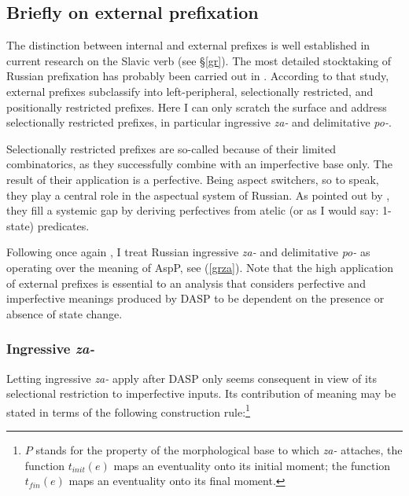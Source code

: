 \documentclass[output=paper,colorlinks,citecolor=brown]{langscibook}
\begin{document}


\subsection{Briefly on external prefixation}\label{zapo}
The distinction between internal and external prefixes is well established in current research on the Slavic verb (see \S \ref{gr}). The most detailed stocktaking of Russian prefixation has probably been carried out in \citet{Tatevo13}. According to that study, external prefixes subclassify into left-peripheral, selectionally restricted, and positionally restricted prefixes. Here I can only scratch the surface and address selectionally restricted prefixes, in particular ingressive \textit{za-} and delimitative \textit{po-}. 

Selectionally restricted prefixes are so-called because of their limited combinatorics, as they successfully combine with an imperfective base only. The result of their application is a perfective.
Being aspect switchers, so to speak, they play a central role in the aspectual system of Russian. As pointed out by \citet{Dickey06}, they fill a systemic gap by deriving perfectives from atelic (or as I would say: 1-state) predicates.     

Following once again \citet{Ramchand08}, I treat Russian ingressive \textit{za-} and delimitative \textit{po-} as operating over the meaning of AspP, see (\ref{grza}). Note that the high application of external prefixes is essential to an analysis that considers perfective and imperfective meanings produced by DASP to be dependent on the presence or absence of state change.  

\subsubsection{Ingressive \textit{za-}}\label{zapoza}
Letting ingressive \textit{za-} apply after DASP only seems consequent in view of its selectional restriction to imperfective inputs. Its contribution of meaning may be stated in terms of the following construction rule:\footnote{$P$ stands for the property of the morphological base to which \textit{za-} attaches, the function $t_{init}(e)$ maps an eventuality onto its initial moment; the function $t_{fin}(e)$ maps an eventuality onto its final moment.}
\end{document}
